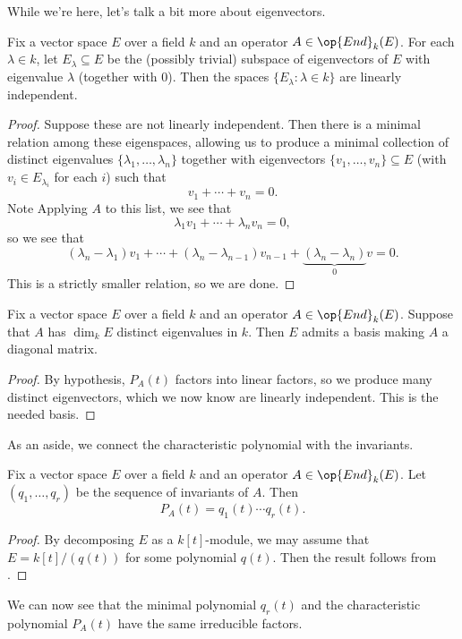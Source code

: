 \documentclass[../notes.tex]{subfiles}
\begin{document}
While we're here, let's talk a bit more about eigenvectors.
\begin{theorem}
	Fix a vector space $E$ over a field $k$ and an operator $A\in\op{End}_k(E)$. For each $\lambda\in k$, let $E_\lambda\subseteq E$ be the (possibly trivial) subspace of eigenvectors of $E$ with eigenvalue $\lambda$ (together with $0$). Then the spaces $\{E_\lambda:\lambda\in k\}$ are linearly independent.
\end{theorem}
\begin{proof}
	Suppose these are not linearly independent. Then there is a minimal relation among these eigen\-spaces, allowing us to produce a minimal collection of distinct eigenvalues $\{\lambda_1,\ldots,\lambda_n\}$ together with eigenvectors $\{v_1,\ldots,v_n\}\subseteq E$ (with $v_i\in E_{\lambda_i}$ for each $i$) such that
	\[v_1+\cdots+v_n=0.\]
	Note Applying $A$ to this list, we see that
	\[\lambda_1v_1+\cdots+\lambda_nv_n=0,\]
	so we see that
	\[(\lambda_n-\lambda_1)v_1+\cdots+(\lambda_n-\lambda_{n-1})v_{n-1}+\underbrace{(\lambda_n-\lambda_n)}_0v=0.\]
	This is a strictly smaller relation, so we are done.
\end{proof}
\begin{corollary}
	Fix a vector space $E$ over a field $k$ and an operator $A\in\op{End}_k(E)$. Suppose that $A$ has $\dim_kE$ distinct eigenvalues in $k$. Then $E$ admits a basis making $A$ a diagonal matrix.
\end{corollary}
\begin{proof}
	By hypothesis, $P_A(t)$ factors into linear factors, so we produce many distinct eigenvectors, which we now know are linearly independent. This is the needed basis.
\end{proof}
As an aside, we connect the characteristic polynomial with the invariants.
\begin{proposition}
	Fix a vector space $E$ over a field $k$ and an operator $A\in\op{End}_k(E)$. Let $(q_1,\ldots,q_r)$ be the sequence of invariants of $A$. Then
	\[P_A(t)=q_1(t)\cdots q_r(t).\]
\end{proposition}
\begin{proof}
	By decomposing $E$ as a $k[t]$-module, we may assume that $E=k[t]/(q(t))$ for some polynomial $q(t)$. Then the result follows from .
\end{proof}
\begin{remark}
	We can now see that the minimal polynomial $q_r(t)$ and the characteristic polynomial $P_A(t)$ have the same irreducible factors.
\end{remark}
\end{document}
